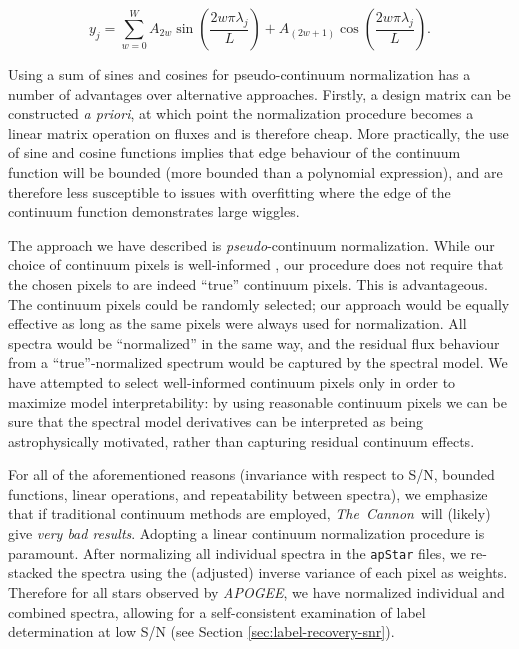 \documentclass[12pt,preprint]{aastex6}
\newcommand{\project}[1]{\textsl{#1}}
\newcommand{\TheCannon}{\project{The~Cannon}}
\newcommand{\acronym}[1]{{\small{#1}}}
\newcommand{\apogee}{\project{\acronym{APOGEE}}}
\begin{document}
\begin{equation}
y_j = \sum_{w=0}^{W} A_{2w}\sin{\left(\frac{2w\pi\lambda_{j}}{L}\right)} + A_{(2w+1)}\cos{\left(\frac{2w\pi\lambda_{j}}{L}\right)}.
\end{equation}

Using a sum of sines and cosines for pseudo-continuum normalization has a number
of advantages over alternative approaches.  Firstly, a design matrix can be
constructed \emph{a priori}, at which point the normalization procedure becomes a
linear matrix operation on fluxes and is therefore cheap.  More practically, 
the use of sine and cosine functions implies that edge behaviour of the 
continuum function will be bounded (more bounded than a polynomial expression),
and are therefore less susceptible to issues with overfitting where the edge of
the continuum function demonstrates large wiggles.


The approach we have described is \emph{pseudo}-continuum normalization.  While 
our choice of continuum pixels is well-informed \citep{tc}, our 
procedure does not require that the chosen pixels to are indeed ``true'' continuum
pixels.  This is advantageous.  The continuum pixels could be randomly selected; 
our approach would be equally effective as long as the same pixels were always
used for normalization.  All spectra would be ``normalized'' in the same way, and
the residual flux behaviour from a ``true''-normalized spectrum would be captured 
by the spectral model.  We have attempted to select well-informed continuum
pixels only in order to maximize model interpretability: by using reasonable 
continuum pixels we can be sure that the spectral model derivatives can be 
interpreted as being astrophysically motivated, rather than capturing residual 
continuum effects.


For all of the aforementioned reasons (invariance with respect to S/N, bounded
functions, linear operations, and repeatability between spectra), we emphasize
that if traditional continuum methods are employed, \TheCannon\ will (likely) 
give \emph{very bad results}.  Adopting a linear continuum normalization 
procedure is paramount.  After normalizing all individual spectra in the
\texttt{apStar} files, we re-stacked the spectra using the (adjusted) inverse
variance of each pixel as weights.  Therefore for all stars observed by \apogee,
we have normalized individual and combined spectra, allowing for a 
self-consistent examination of label determination at low S/N (see Section
\ref{sec:label-recovery-snr}).
\end{document}
